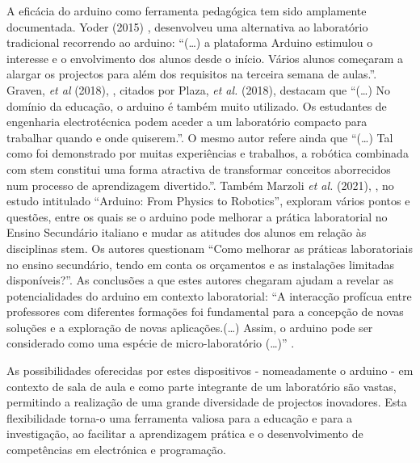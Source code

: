 A eficácia do \gls{arduino} como ferramenta pedagógica tem sido amplamente documentada. Yoder (2015) \cite{yoder}, desenvolveu uma alternativa ao laboratório tradicional recorrendo ao \gls{arduino}: ``(\dots) a plataforma Arduino estimulou o interesse e o envolvimento dos alunos desde o início. Vários alunos começaram a alargar os projectos para além dos requisitos na terceira semana de aulas.''. Graven, \textit{et al} (2018), \cite{graven}, citados por Plaza, \textit{et al.} (2018), \cite{plaza} destacam que ``(\ldots) No domínio da educação, o \gls{arduino} é também muito utilizado. Os estudantes de engenharia electrotécnica podem aceder a um laboratório compacto para trabalhar quando e onde quiserem.''. O mesmo autor refere ainda que ``(\ldots) Tal como foi demonstrado por muitas experiências e trabalhos, a robótica combinada com \acrshort{stem} constitui uma forma atractiva de transformar conceitos aborrecidos num processo de aprendizagem divertido.''. Também Marzoli \textit{et al.} (2021), \cite{Marzoli}, no estudo intitulado ``Arduino: From Physics to Robotics'', exploram vários pontos e questões, entre os quais se o \gls{arduino} pode melhorar a prática laboratorial no Ensino Secundário italiano e mudar as atitudes dos alunos em relação às disciplinas \acrshort{stem}. Os autores questionam ``Como melhorar as práticas laboratoriais no ensino secundário, tendo em conta os orçamentos e as instalações limitadas disponíveis?''. As conclusões a que estes autores chegaram ajudam a revelar as potencialidades do \gls{arduino} em contexto laboratorial: ``A interacção profícua entre professores com diferentes formações foi fundamental para a concepção de novas soluções e a exploração de novas aplicações.(\ldots) Assim, o \gls{arduino} pode ser considerado como uma espécie de micro-laboratório (\ldots)'' \cite{Marzoli}.

As possibilidades oferecidas por estes dispositivos - nomeadamente o \gls{arduino} - em contexto de sala de aula e como parte integrante de um laboratório são vastas, permitindo a realização de uma grande diversidade de projectos inovadores. Esta flexibilidade torna-o uma ferramenta valiosa para a educação e para a investigação, ao facilitar a aprendizagem prática e o desenvolvimento de competências em electrónica e programação.

